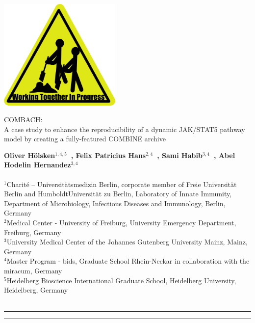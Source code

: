 \begin{titlepage}


\begin{centering}
\includegraphics[scale=0.5, width=6cm]{figures/unnamed1}
\vspace{1cm}

{\noindent\huge{COMBACH:\\ A case study to enhance the reproducibility of a dynamic JAK/STAT5 pathway model by creating a fully-featured COMBINE archive }}

\end{centering}


\vspace{2cm}
\noindent\textbf{Oliver H\"olsken$^{1,4,5}$~, Felix Patricius Hans$^{2,4}$~, Sami Habib$^{3,4}$~, Abel Hodelin Hernandez$^{3,4}$~}
\\ \\
	\small $^{1}$Charité – Universit\"atsmedizin Berlin, corporate member of Freie Universit\"at Berlin and HumboldtUniversit\"at zu Berlin, Laboratory of Innate Immunity, Department of Microbiology, Infectious Diseases and Immunology, Berlin, Germany \\
	\small $^{2}$Medical Center - University of Freiburg, University Emergency Department, Freiburg, Germany \\
	\small $^{3}$University Medical Center of the Johannes Gutenberg University Mainz, Mainz, Germany \\
	\small $^{4}$Master Program - \ac{bids}, Graduate School Rhein-Neckar in collaboration with the \ac{miracum}, Germany \\
	\small $^{5}$Heidelberg Bioscience International Graduate School, Heidelberg University, Heidelberg, Germany \\
	\\


\newpage
\hrule

 \hspace{10pt}

\noindent{}

\hrule
\end{titlepage}
